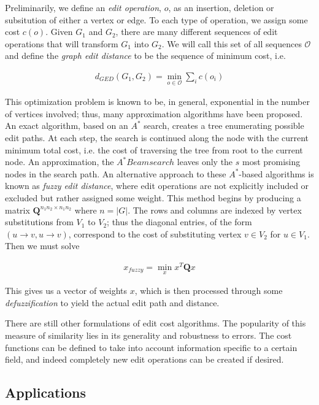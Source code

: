 \documentclass[11pt]{article}
\begin{document}
Preliminarily, we define an \textit{edit operation}, $o$, as an insertion, deletion or subsitution of either a vertex or edge. To each type of operation, we assign some cost $c(o)$. Given $G_1$ and $G_2$, there are many different sequences of edit operations that will transform $G_1$ into $G_2$. We will call this set of all sequences $\mathcal{O}$ and define the \textit{graph edit distance} to be the sequence of minimum cost, i.e.

\begin{align}
d_{GED}(G_1, G_2) = \min\limits_{o \in \mathcal{O}} \sum\limits_{i} c(o_i)
\label{eqn:ged}
\end{align}
 
This optimization problem is known to be, in general, exponential in the number of vertices involved; thus, many approximation algorithms have been proposed. An exact algorithm, based on an $A^{*}$ search, creates a tree enumerating possible edit paths. At each step, the search is continued along the node with the current minimum total cost, i.e. the cost of traversing the tree from root to the current node. An approximation, the $A^{*} Beamsearch$ leaves only the $s$ most promising nodes in the search path. An alternative approach to these $A^{*}$-based algorithms is known as \textit{fuzzy edit distance}, where edit operations are not explicitly included or excluded but rather assigned some weight. This method begins by producing a matrix $\textbf{Q}^{n_1n_2 \times n_1n_2}$ where $n = |G|$. The rows and columns are indexed by vertex substitutions from $V_1$ to $V_2$; thus the diagonal entries, of the form $(u \rightarrow v, u \rightarrow v)$, correspond to the cost of substituting vertex $v \in V_2$ for $u \in V_1$. Then we must solve

\begin{align}
x_{fuzzy} = \min\limits_{x} x^T\textbf{Q}x
\label{eqn:fuzzy}
\end{align}

This gives us a vector of weights $x$, which is then processed through some \textit{defuzzification} to yield the actual edit path and distance. 

There are still other formulations of edit cost algorithms. The popularity of this measure of similarity lies in its generality and robustness to errors. The cost functions can be defined to take into account information specific to a certain field, and indeed completely new edit operations can be created if desired.

\subsection{Applications}
\end{document}
